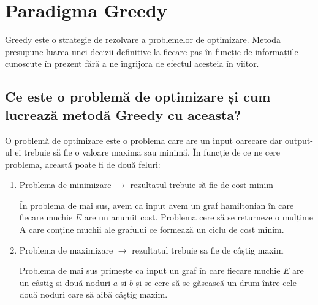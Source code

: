 \chapter{Paradigma Greedy}
Greedy este o strategie de rezolvare a problemelor de optimizare. Metoda presupune luarea unei decizii definitive la fiecare pas în funcție de informațiile cunoscute în prezent fără a ne îngrijora de efectul acesteia în viitor.


\section{Ce este o problemă de optimizare și cum lucrează metodă Greedy cu aceasta?}

O problemă de optimizare este o problema care are un input oarecare dar output-ul ei trebuie să fie o valoare maximă sau minimă.
În funcție de ce ne cere problema, această poate fi de două feluri: 
\begin{enumerate}
	\item Problema de minimizare $\rightarrow$ rezultatul trebuie să fie de cost minim
	\par
	\par 
	\setlength{\parindent}{2em}
	În problema de mai sus, avem ca input avem un graf hamiltonian în care fiecare muchie $E$ are un anumit cost. Problema cere să se returneze o mulțime A care conține muchii ale grafului ce formează un ciclu de cost minim.
	\par
	\vspace{4cm}
	\setlength{\parindent}{0em}
	\item Problema de maximizare $\rightarrow$ rezultatul trebuie sa fie de câștig maxim
	\par
\par 
\setlength{\parindent}{2em}
Problema de mai sus primește ca input un graf în care fiecare muchie $E$ are un câștig și două noduri $a$ și $b$ și se cere să se găsească un drum între cele două noduri care să aibă câștig maxim.


\end{enumerate}

